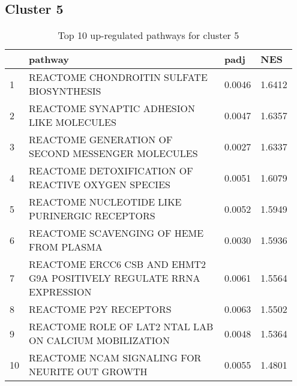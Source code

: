 \documentclass{article}
\begin{document}
\subsection{Cluster 5 }
\begin{table}[H]
\centering
\begin{tabular}{p{0.05\linewidth}p{0.7\linewidth}p{0.1\linewidth}p{0.1\linewidth}}
  \hline
 & pathway & padj & NES \\ 
  \hline
1 & REACTOME CHONDROITIN SULFATE BIOSYNTHESIS & 0.0046 & 1.6412 \\ 
  2 & REACTOME SYNAPTIC ADHESION LIKE MOLECULES & 0.0047 & 1.6357 \\ 
  3 & REACTOME GENERATION OF SECOND MESSENGER MOLECULES & 0.0027 & 1.6337 \\ 
  4 & REACTOME DETOXIFICATION OF REACTIVE OXYGEN SPECIES & 0.0051 & 1.6079 \\ 
  5 & REACTOME NUCLEOTIDE LIKE PURINERGIC RECEPTORS & 0.0052 & 1.5949 \\ 
  6 & REACTOME SCAVENGING OF HEME FROM PLASMA & 0.0030 & 1.5936 \\ 
  7 & REACTOME ERCC6 CSB AND EHMT2 G9A POSITIVELY REGULATE RRNA EXPRESSION & 0.0061 & 1.5564 \\ 
  8 & REACTOME P2Y RECEPTORS & 0.0063 & 1.5502 \\ 
  9 & REACTOME ROLE OF LAT2 NTAL LAB ON CALCIUM MOBILIZATION & 0.0048 & 1.5364 \\ 
  10 & REACTOME NCAM SIGNALING FOR NEURITE OUT GROWTH & 0.0055 & 1.4801 \\ 
   \hline
\end{tabular}
\caption{Top 10 up-regulated pathways for cluster 5} 
\label{tab:q3_2_5}
\end{table}
\end{document}
